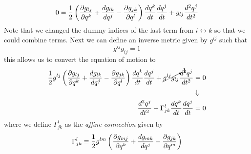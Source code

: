 \documentclass[11pt]{article}
\numberwithin{equation}{section}
\begin{document}
\begin{enumerate}[(a)]
\begin{align*}
0 &= \frac{1}{2}\left(\frac{\partial g_{lj}}{\partial q^k} + \frac{dg_{lk}}{dq^{j}} - \frac{\partial{g_{jk}}}{\partial{q^l}}\right)\frac{dq^{k}}{dt}\frac{dq^j}{dt} + g_{lj}\frac{d^2q^j}{dt^2}\\
\end{align*}
Note that we changed the dummy indices of the last term from $i\leftrightarrow{k}$ so that we
could combine terms. Next we can define an inverse metric given by $g^{ij}$ such that
$$g^{ij}g_{ij} = 1$$
this allows us to convert the equation of motion to
\begin{align*}
\frac{1}{2}g^{lj}\left(\frac{\partial g_{lj}}{\partial q^k} + \frac{dg_{lk}}{dq^{j}} - \frac{\partial{g_{jk}}}{\partial{q^l}}\right)\frac{dq^{k}}{dt}\frac{dq^j}{dt} + \cancelto{1}{g^{lj}g_{lj}}\frac{d^2q^j}{dt^2} &= 0\\
&\Downarrow\\
\frac{d^2q^j}{dt^2} + \Gamma^{l}_{jk}\frac{dq^{k}}{dt}\frac{dq^j}{dt} &= 0
\end{align*}
where we define $\Gamma^{l}_{jk}$ as the \emph{affine connection} given by
$$\Gamma^{l}_{jk} \equiv \frac{1}{2}g^{lm}\left(\frac{\partial g_{mj}}{\partial q^k} + \frac{dg_{mk}}{dq^{j}} - \frac{\partial{g_{jk}}}{\partial{q^m}}\right)$$


\end{enumerate}
\end{document}
